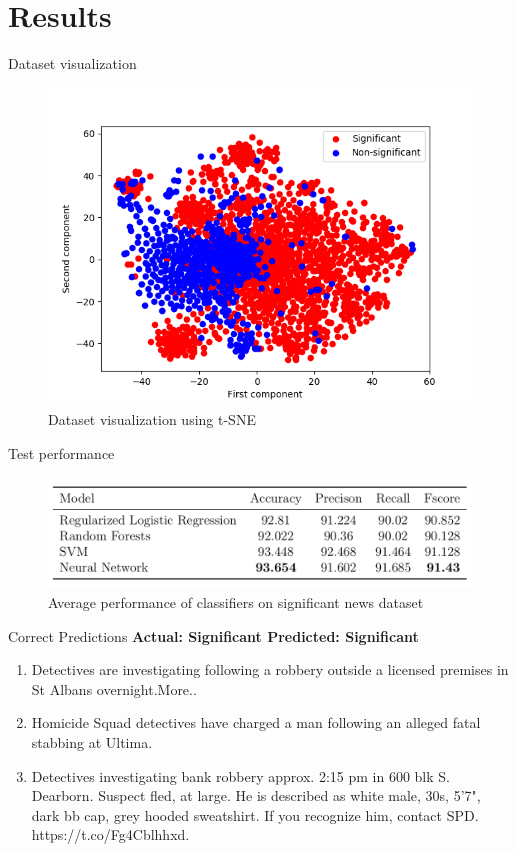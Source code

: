 \documentclass[12pt]{beamer}
\begin{document}
\section{Results}

\begin{frame}{Dataset visualization}
\begin{figure}[h]
    \includegraphics[scale=0.5]{images/data_visualization.png}
    \caption{Dataset visualization using t-SNE}
    \label{fig:dataset}
\end{figure}
\end{frame}

\begin{frame}{Test performance}
\begin{figure}[h]
    \includegraphics[width=\textwidth]{images/avg_performance.png}
    \caption{Average performance of classifiers on significant news dataset}
    \label{tbl:average_performance}
\end{figure}
\end{frame}

\begin{frame}{Correct Predictions}
    \textbf{Actual: Significant \hfill Predicted: Significant}
    \begin{enumerate}
        \item Detectives are investigating following a robbery outside a licensed premises in St Albans overnight.More..
        \item Homicide Squad detectives have charged a man following an alleged fatal stabbing at Ultima.
        \item Detectives investigating bank robbery approx. 2:15 pm in 600 blk S. Dearborn.  Suspect fled, at large. He is described as white male, 30s, 5'7", dark bb cap, grey hooded sweatshirt. If you recognize him, contact SPD. https://t.co/Fg4Cblhhxd.
    \end{enumerate}
\end{frame}
\end{document}
